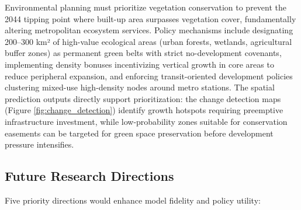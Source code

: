 \documentclass[12pt,a4paper]{article}
\begin{document}
Environmental planning must prioritize vegetation conservation to prevent the 2044 tipping point where built-up area surpasses vegetation cover, fundamentally altering metropolitan ecosystem services. Policy mechanisms include designating 200--300 km² of high-value ecological areas (urban forests, wetlands, agricultural buffer zones) as permanent green belts with strict no-development covenants, implementing density bonuses incentivizing vertical growth in core areas to reduce peripheral expansion, and enforcing transit-oriented development policies clustering mixed-use high-density nodes around metro stations. The spatial prediction outputs directly support prioritization: the change detection maps (Figure \ref{fig:change_detection}) identify growth hotspots requiring preemptive infrastructure investment, while low-probability zones suitable for conservation easements can be targeted for green space preservation before development pressure intensifies.

\subsection{Future Research Directions}

Five priority directions would enhance model fidelity and policy utility:
\end{document}

